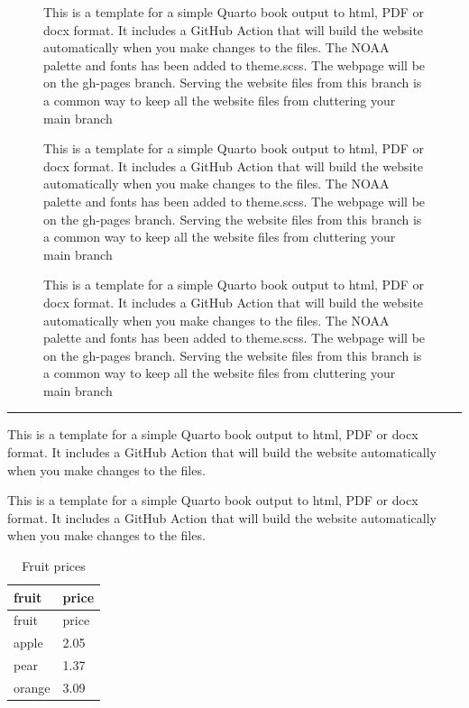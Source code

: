 \documentclass[
  a4paper,
  DIV=11,
  numbers=noendperiod,
  oneside,
  open=any]{scrreprt}
\begin{document}
\begin{figure}

\begin{minipage}{0.33\linewidth}
This is a template for a simple Quarto book output to html, PDF or docx
format. It includes a GitHub Action that will build the website
automatically when you make changes to the files. The NOAA palette and
fonts has been added to theme.scss. The webpage will be on the gh-pages
branch. Serving the website files from this branch is a common way to
keep all the website files from cluttering your main
branch\end{minipage}%
%
\begin{minipage}{0.33\linewidth}
This is a template for a simple Quarto book output to html, PDF or docx
format. It includes a GitHub Action that will build the website
automatically when you make changes to the files. The NOAA palette and
fonts has been added to theme.scss. The webpage will be on the gh-pages
branch. Serving the website files from this branch is a common way to
keep all the website files from cluttering your main
branch\end{minipage}%
%
\begin{minipage}{0.33\linewidth}
This is a template for a simple Quarto book output to html, PDF or docx
format. It includes a GitHub Action that will build the website
automatically when you make changes to the files. The NOAA palette and
fonts has been added to theme.scss. The webpage will be on the gh-pages
branch. Serving the website files from this branch is a common way to
keep all the website files from cluttering your main
branch\end{minipage}%

\end{figure}%

\begin{center}\rule{0.5\linewidth}{0.5pt}\end{center}

This is a template for a simple Quarto book output to html, PDF or docx
format. It includes a GitHub Action that will build the website
automatically when you make changes to the files.

This is a template for a simple Quarto book output to html, PDF or docx
format. It includes a GitHub Action that will build the website
automatically when you make changes to the files.

\begin{longtable}[]{@{}ll@{}}
\caption{Fruit prices}\tabularnewline
\toprule\noalign{}
fruit & price \\
\midrule\noalign{}
\endfirsthead
\toprule\noalign{}
fruit & price \\
\midrule\noalign{}
\endhead
\bottomrule\noalign{}
\endlastfoot
apple & 2.05 \\
pear & 1.37 \\
orange & 3.09 \\
\end{longtable}
\end{document}
